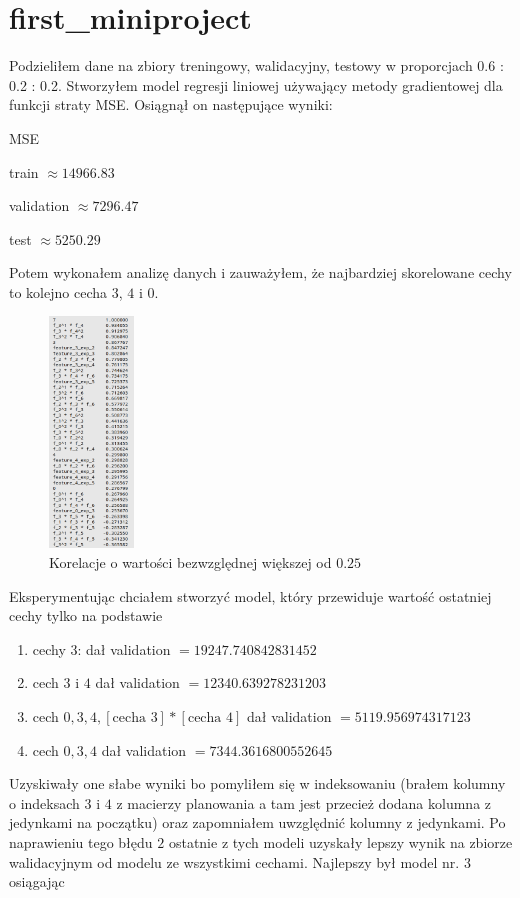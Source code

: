 \documentclass{article}
\begin{document}
  \section{first\_miniproject}

  Podzieliłem dane na zbiory treningowy, walidacyjny, testowy w proporcjach 0.6 : 0.2 : 0.2.
  Stworzyłem model regresji liniowej używający metody gradientowej dla funkcji straty MSE. Osiągnął on następujące wyniki:

  MSE

  train $\approx 14966.83$

  validation $\approx 7296.47$

  test $\approx 5250.29$

  Potem wykonałem analizę danych i zauważyłem, że najbardziej skorelowane cechy to kolejno cecha $3$, $4$ i $0$.

  \begin{figure}
    \centering
    \includegraphics[width=0.2\textwidth]{Correlations.png}
    \caption{Korelacje o wartości bezwzględnej większej od $0.25$}
  \end{figure}

  Eksperymentując chciałem stworzyć model, który przewiduje wartość ostatniej cechy tylko na podstawie 
  \begin{enumerate}
    \item cechy $3$: dał validation $= 19247.740842831452$
    \item cech $3$ i $4$ dał validation $= 12340.639278231203$ 
    \item cech $0, 3, 4, [\text{cecha } 3] * [\text{cecha } 4]$ dał validation $= 5119.956974317123$
    \item cech $0, 3, 4 $  dał validation $= 7344.3616800552645$
  \end{enumerate}
  Uzyskiwały one słabe wyniki bo pomyliłem się w indeksowaniu (brałem kolumny o indeksach $3$ i $4$ z macierzy planowania a tam jest przecież dodana kolumna z jedynkami na początku) 
  oraz zapomniałem uwzględnić kolumny z jedynkami.
  Po naprawieniu tego błędu $2$ ostatnie z tych modeli uzyskały lepszy wynik na zbiorze walidacyjnym od modelu ze wszystkimi cechami.
  Najlepszy był model nr. $3$ osiągając
\end{document}
